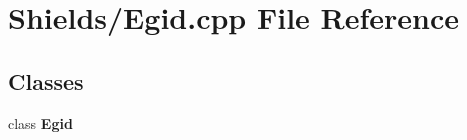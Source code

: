 \section{Shields/\-Egid.cpp File Reference}
\label{_egid_8cpp}
\subsection*{Classes}
\begin{DoxyCompactItemize}
\item 
class {\bf Egid}
\end{DoxyCompactItemize}
